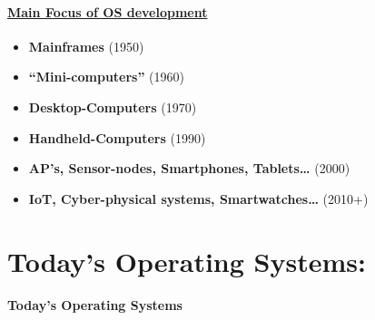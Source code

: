 \documentclass[
]{article}
\providecommand{\tightlist}{%
  \setlength{\itemsep}{0pt}\setlength{\parskip}{0pt}}
\begin{document}
\hypertarget{main-focus-of-os-development}{%
\paragraph{\texorpdfstring{\href{https://en.wikipedia.org/wiki/Timeline_of_operating_systems}{Main
Focus of OS
development}}{Main Focus of OS development}}\label{main-focus-of-os-development}}

\begin{itemize}
\tightlist
\item
  \textbf{Mainframes} (1950)
\item
  \textbf{``Mini-computers''} (1960)
\item
  \textbf{Desktop-Computers} (1970)
\item
  \textbf{Handheld-Computers} (1990)
\item
  \textbf{AP's, Sensor-nodes, Smartphones, Tablets\ldots{}} (2000)
\item
  \textbf{IoT, Cyber-physical systems, Smartwatches\ldots{}} (2010+)
\end{itemize}

\hypertarget{todays-operating-systems}{%
\section{Today's Operating Systems:}\label{todays-operating-systems}}

\hypertarget{todays-operating-systems-1}{%
\paragraph{Today's Operating Systems}\label{todays-operating-systems-1}}
\end{document}

